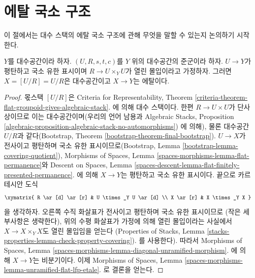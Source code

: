 












\section{에탈 국소 구조}
\label{section-etale-local}

\noindent
이 절에서는 대수 스택의 에탈 국소 구조에 관해 무엇을 말할 수 있는지
논의하기 시작한다.

\begin{lemma}
\label{lemma-quotient-etale}
$Y$를 대수공간이라 하자. $(U, R, s, t, c)$를 $Y$ 위의 대수공간의
준군이라 하자. $U \to Y$가 평탄하고 국소 유한 표시이며
$R \to U \times_Y U$가 열린 몰입이라고 가정하자. 그러면
$X = [U/R] = U/R$은 대수공간이고 $X \to Y$는 에탈이다.
\end{lemma}

\begin{proof}
몫스택 $[U/R]$은 Criteria for Representability, Theorem
\ref{criteria-theorem-flat-groupoid-gives-algebraic-stack}.
에 의해 대수 스택이다.%
한편 $R \to U \times U$가 단사상이므로 이는 대수공간이며(우리의 언어
남용과 Algebraic Stacks, Proposition
\ref{algebraic-proposition-algebraic-stack-no-automorphisms})
에 의해), 물론 대수공간 $U/R$과 같다(Bootstrap, Theorem
\ref{bootstrap-theorem-final-bootstrap}). $U \to X$가 전사이고
평탄하며 국소 유한 표시이므로(Bootstrap, Lemma
\ref{bootstrap-lemma-covering-quotient}), Morphisms of Spaces, Lemma
\ref{spaces-morphisms-lemma-flat-permanence}와 Descent on Spaces, Lemma
\ref{spaces-descent-lemma-flat-finitely-presented-permanence}.
에 의해 $X \to Y$는 평탄하고 국소 유한 표시이다. 끝으로 카르테시안
도식
$$
\xymatrix{
R \ar[d] \ar[r] & U \times_Y U \ar[d] \\
X \ar[r] & X \times_Y X
}
$$
을 생각하자. 오른쪽 수직 화살표가 전사이고 평탄하며 국소 유한 표시이므로
(작은 세부사항은 생략한다), 위의 수평 화살표가 가정에 의해 열린
몰입이라는 사실에서 $X \to X \times_Y X$도 열린 몰입임을 얻는다
(Properties of Stacks, Lemma
\ref{stacks-properties-lemma-check-property-covering}).
를 사용한다). 따라서 Morphisms of Spaces, Lemma
\ref{spaces-morphisms-lemma-diagonal-unramified-morphism}.
에 의해 $X \to Y$는 비분기이다. 이제 Morphisms of Spaces, Lemma
\ref{spaces-morphisms-lemma-unramified-flat-lfp-etale}.
로 결론을 얻는다.
\end{proof}

